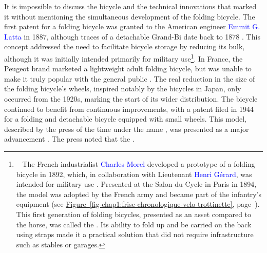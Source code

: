 \begin{refsegment}
It is impossible to discuss the bicycle and the technical innovations that marked it without mentioning the simultaneous development of the folding bicycle. The first patent for a folding bicycle was granted to the American engineer \textcolor{blue}{Emmit G. Latta} in 1887, although traces of a detachable Grand-Bi date back to 1878 \textcolor{blue}{\autocite{the_folding_cyclist_history_2010}}. This concept addressed the need to facilitate bicycle storage by reducing its bulk, although it was initially intended primarily for military use\footnote{~
    The French industrialist \textcolor{blue}{Charles Morel} developed a prototype of a folding bicycle in 1892, which, in collaboration with Lieutenant \textcolor{blue}{Henri Gérard}, was intended for military use \textcolor{blue}{\autocite{the_folding_cyclist_history_2010}}. Presented at the Salon du Cycle in Paris in 1894, the  model was adopted by the French army and became part of the infantry’s equipment (see \hyperref[fig-chap1:frise-chronologique-velo-trottinette]{Figure~\ref{fig-chap1:frise-chronologique-velo-trottinette}}, page~\pageref{fig-chap1:frise-chronologique-velo-trottinette}). This first generation of folding bicycles, presented as an asset compared to the horse, was called the . Its ability to fold up and be carried on the back using straps made it a practical solution that did not require infrastructure such as stables or garages.
}. In France, the Peugeot brand marketed a lightweight adult folding bicycle, but was unable to make it truly popular with the general public \textcolor{blue}{\autocite{transportation_alternatives_folding_2013}}. The real reduction in the size of the folding bicycle's wheels, inspired notably by the  bicycles in Japan, only occurred from the 1920s, marking the start of its wider distribution. The bicycle continued to benefit from continuous improvements, with a patent filed in 1944 for a folding and detachable bicycle equipped with small wheels. This model, described by the press of the time under the name , was presented as a major advancement \textcolor{blue}{\autocite[44]{jouenne_quest-ce_2022}}. The press noted that the   \textcolor{blue}{\autocite{the_folding_cyclist_history_2010}}.%


\end{refsegment}
